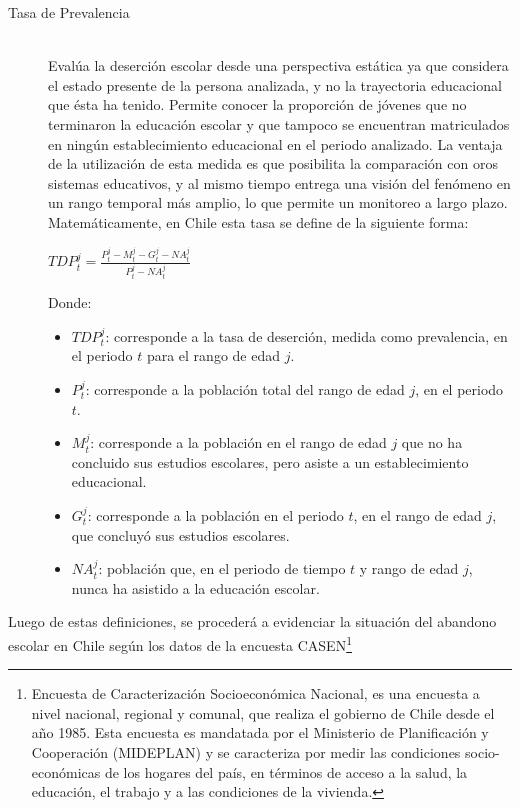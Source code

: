 \begin{description}
\item[Tasa de Prevalencia] \hfill \\
  Evalúa la deserción escolar desde una perspectiva estática ya que considera el estado presente de la persona analizada, y no la trayectoria educacional que ésta ha tenido. Permite conocer la proporción de jóvenes que no terminaron la educación escolar y que tampoco se encuentran matriculados en ningún establecimiento educacional en el periodo analizado.
  La ventaja de la utilización de esta medida es que posibilita la comparación con oros sistemas educativos, y al mismo tiempo entrega una visión del fenómeno en un rango temporal más amplio, lo que permite un monitoreo a largo plazo.
  Matemáticamente, en Chile esta tasa se define de la siguiente forma:\\
   
   \begin{center}
$TDP_t^j = \frac{P_{t}^{j} - M_{t}^{j} - G_{t}^{j} - NA_{t}^{j}}{P_{t}^{j} - NA_{t}^{j}}$
    \end{center}
Donde:
\begin{itemize}[label=]
    \item $TDP_t^j$: corresponde a la tasa de deserción, medida
como prevalencia, en el periodo $t$ para el rango de edad $j$.
    \item $P_{t}^{j}$:  corresponde a la población total del rango de edad $j$, en el periodo $t$.
    \item $M_{t}^{j}$: corresponde a la población en el rango de edad $j$ que no ha concluido sus estudios escolares, pero asiste a un establecimiento educacional.
    \item $G_{t}^{j}$: corresponde a la población en el periodo $t$, en el rango de edad $j$, que concluyó sus estudios escolares.
    \item $NA_{t}^{j}$: población que, en el periodo de tiempo $t$ y rango de edad $j$, nunca ha asistido a la educación escolar.
\end{itemize}
\end{description}

Luego de estas definiciones, se procederá a evidenciar la situación del abandono escolar en Chile según los datos de la encuesta CASEN\footnote{Encuesta de Caracterización Socioeconómica Nacional, es una encuesta a nivel nacional, regional y comunal, que realiza el gobierno de Chile desde el año 1985. Esta encuesta es mandatada por el Ministerio de Planificación y Cooperación (MIDEPLAN) y se caracteriza por medir las condiciones socio-económicas de los hogares del país, en términos de acceso a la salud, la educación, el trabajo y a las condiciones de la vivienda.}

